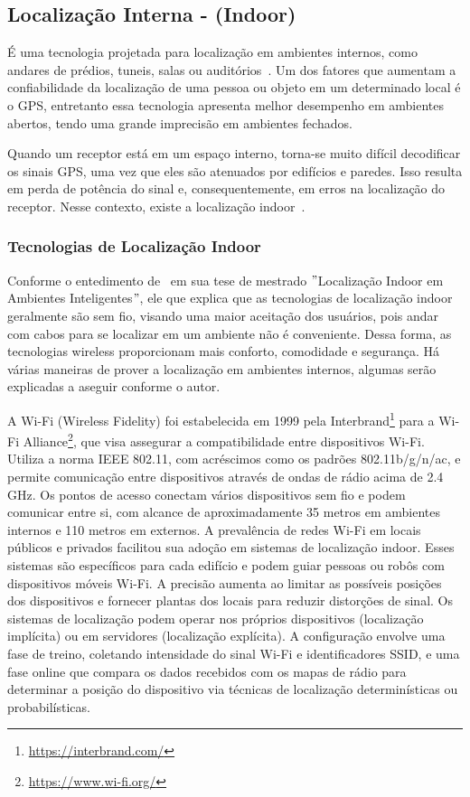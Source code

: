 \subsection{Localização Interna - (Indoor)}\label{subsec:localizacao-indoor}

É uma tecnologia projetada para localização em ambientes internos, como andares de prédios, tuneis, salas ou auditórios~\cite{mittelstadt2018bluepath}.
Um dos fatores que aumentam a confiabilidade da localização de uma pessoa ou objeto em um determinado local é o GPS, entretanto essa tecnologia apresenta melhor desempenho em ambientes abertos, tendo uma grande imprecisão em ambientes fechados.

Quando um receptor está em um espaço interno, torna-se muito difícil decodificar os sinais GPS, uma vez que eles são atenuados por edifícios e paredes.
Isso resulta em perda de potência do sinal e, consequentemente, em erros na localização do receptor.
Nesse contexto, existe a localização indoor~\cite{mittelstadt2018bluepath}.

\subsubsection{Tecnologias de Localização Indoor}\label{subsubsec:tecnologias-localizacao-indoor}
Conforme o entedimento de~\cite{novais2014localizaccao} em sua tese de mestrado \("\)Localização Indoor em Ambientes Inteligentes\("\), ele que explica que as tecnologias de localização indoor geralmente são sem fio, visando uma maior aceitação dos usuários, pois andar com cabos para se localizar em um ambiente não é conveniente.
Dessa forma, as tecnologias wireless proporcionam mais conforto, comodidade e segurança.
Há várias maneiras de prover a localização em ambientes internos, algumas serão explicadas a aseguir conforme o autor.

\label{subsubsubsec:wifi}
A Wi-Fi (Wireless Fidelity) foi estabelecida em 1999 pela Interbrand\footnote{\url{https://interbrand.com/}} para a Wi-Fi Alliance\footnote{\url{https://www.wi-fi.org/}}, que visa assegurar a compatibilidade entre dispositivos Wi-Fi. Utiliza a norma IEEE 802.11, com acréscimos como os padrões 802.11b/g/n/ac, e permite comunicação entre dispositivos através de ondas de rádio acima de 2.4 GHz. Os pontos de acesso conectam vários dispositivos sem fio e podem comunicar entre si, com alcance de aproximadamente 35 metros em ambientes internos e 110 metros em externos.
A prevalência de redes Wi-Fi em locais públicos e privados facilitou sua adoção em sistemas de localização indoor.
Esses sistemas são específicos para cada edifício e podem guiar pessoas ou robôs com dispositivos móveis Wi-Fi. A precisão aumenta ao limitar as possíveis posições dos dispositivos e fornecer plantas dos locais para reduzir distorções de sinal.
Os sistemas de localização podem operar nos próprios dispositivos (localização implícita) ou em servidores (localização explícita).
A configuração envolve uma fase de treino, coletando intensidade do sinal Wi-Fi e identificadores SSID, e uma fase online que compara os dados recebidos com os mapas de rádio para determinar a posição do dispositivo via técnicas de localização determinísticas ou probabilísticas.

